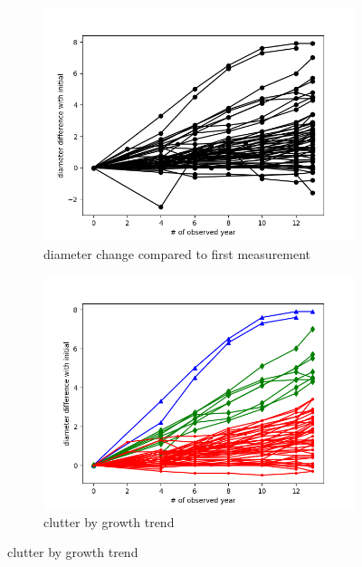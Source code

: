 \documentclass{article}
\begin{document}
\begin{figure}[H]
    \centering
    \begin{subfigure}{.5\textwidth}
        \centering
        \includegraphics[width=1\textwidth]{cm-initial-diff.png}
        \caption{diameter change compared to first measurement}
        \label{fig:cm-initial-diff}
    \end{subfigure}%
    \begin{subfigure}{.5\textwidth}
        \centering
        \includegraphics[width=1\textwidth]{cm-initial-diff-clean-group.png}
        \caption{clutter by growth trend}
        \label{fig:cm-initial-diff-clean-group}
    \end{subfigure}
\end{figure}
\end{document}
